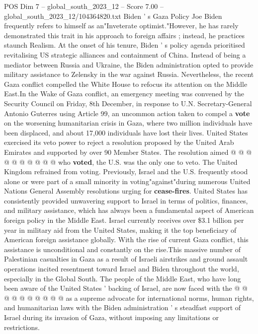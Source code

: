 \begin{textsample}{POS Dim 7 – global\_south\_2023\_12 – Score 7.00 – global\_south\_2023\_12/104364820.txt}  \label{ex:f7_pos_258}
Biden ' s Gaza Policy Joe Biden frequently refers to himself as an"Inveterate optimist."However, he has rarely demonstrated this trait in his approach to foreign affairs ; instead, he practices staunch Realism.
At the onset of his tenure, Biden ' s policy agenda prioritised revitalising US strategic alliances and containment of China.
Instead of being a mediator between Russia and Ukraine, the Biden administration opted to provide military assistance to Zelensky in the war against Russia.
Nevertheless, the recent Gaza conflict compelled the White House to refocus its attention on the Middle East.In the Wake of Gaza conflict, an emergency meeting was convened by the Security Council on Friday, 8th December, in response to U.N.
Secretary-General Antonio Guterres using Article 99, an uncommon action taken to compel a \textbf{vote} on the worsening humanitarian crisis in Gaza, where two million individuals have been displaced, and about 17,000 individuals have lost their lives.
United States exercised its veto power to reject a resolution proposed by the United Arab Emirates and supported by over 90 Member States.
The resolution aimed @ @ @ @ @ @ @ @ @ @ who \textbf{voted}, the U.S. was the only one to veto.
The United Kingdom refrained from voting.
Previously, Israel and the U.S. frequently stood alone or were part of a small minority in voting"against"during numerous United Nations General Assembly resolutions urging for \textbf{cease-fires}.
United States has consistently provided unwavering support to Israel in terms of politics, finances, and military assistance, which has always been a fundamental aspect of American foreign policy in the Middle East.
Israel currently receives over \$3.1 billion per year in military aid from the United States, making it the top beneficiary of American foreign assistance globally.
With the rise of current Gaza conflict, this assistance is unconditional and constantly on the rise.This massive number of Palestinian casualties in Gaza as a result of Israeli airstrikes and ground assault operations incited resentment toward Israel and Biden throughout the world, especially in the Global South.
The people of the Middle East, who have long been aware of the United States ' backing of Israel, are now faced with the @ @ @ @ @ @ @ @ @ @ as a supreme advocate for international norms, human rights, and humanitarian laws with the Biden administration ' s steadfast support of Israel during its invasion of Gaza, without imposing any limitations or restrictions.

\end{textsample}
